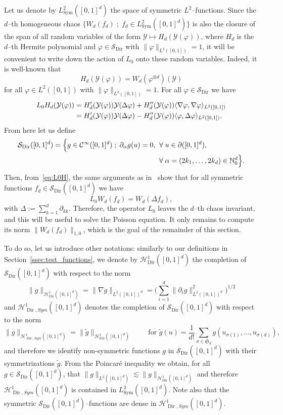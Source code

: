 \documentclass[10pt]{amsart}
\theoremstyle{definition}\newtheorem{defi}[theo]{Definition}\newtheorem{rema}[theo]{Remark}\newtheorem{exam}[theo]{Example}\newtheorem{exem}[theo]{Example}\newtheorem{nota}[theo]{Notation}
\DeclareMathOperator{\Dir}{Dir}
\DeclareMathOperator{\Sym}{Sym}
\newcommand{\bb}[1]{{\mathbb #1}}
\newcommand{\mc}[1]{{\mathcal #1}}
\renewcommand{\mc}[1]{{\mathcal #1}}
\newcommand{\Ctwo}{\ensuremath{\mc S_{\Dir}}}
\newcommand{\SD}{\ensuremath{\mc S_{\Dir}}}
\let\oldforall\forall
\renewcommand*{\forall}{\mathrel{\oldforall}}
\begin{document}

Let us denote by $L^2_{\Sym}([0,1]^d)$ the space of symmetric $L^2$--functions. Since the $d$--th homogeneous chaos $\{W_d(f_d) \; ; \; f_d \in L^2_{\Sym}([0,1]^d)\}$ is also the closure of the span of all random variables of the form $\mc Y \mapsto H_d(\mc Y(\varphi))$, where $H_d$ is the $d$--th Hermite polynomial and $\varphi \in \SD$ with $\|\varphi\|_{L^2([0,1])}=1$, it will be convenient to write down the action of $L_0$ onto these random variables. Indeed, it is well-known that
\[
H_d(\mc Y(\varphi)) = W_d(\varphi^{\otimes d})(\mc Y)
\]
for all $\varphi \in L^2([0,1])$ with $\|\varphi\|_{L^2([0,1])} = 1$. For all $\varphi \in
\Ctwo$ we have
\begin{align}
\notag L_0 H_d (\mc Y(\varphi)) & = H'_d (\mc Y(\varphi)) \mc Y(\Delta \varphi) + H''_d (\mc Y(\varphi)) \langle \nabla \varphi, \nabla \varphi \rangle_{L^2 ([0, 1])}\\
& = H'_d (\mc Y(\varphi)) \mc Y(\Delta \varphi) - H''_d (\mc Y(\varphi))
\langle \varphi, \Delta \varphi \rangle_{L^2 ([0, 1])}. \label{eq:L0H}
\end{align}
From here let us define
\begin{align*}
\mc \SD ([0, 1]^d) = \Big\{ g \in \mc C^\infty ([0, 1]^d) \; ; \; \partial_\alpha g(u) = 0, \; &\forall u \in \partial ([0, 1]^d),
\\ &\forall \alpha=(2k_1,\dots, 2k_d) \in \bb N_0^d \Big\}.
\end{align*}
Then, from~\eqref{eq:L0H}, the same arguments as in~\cite[Lemma~3.7]{Gubinelli2015Energy} show that for all symmetric functions $ f_d \in \SD ([0, 1]^d) $ we have
\begin{equation}\label{eq:L0W}
L_0 W_d (f_d) = W_d (\Delta f_d),
\end{equation}
with $\Delta := \sum_{k = 1}^d \partial_{kk}$. Therefore, the operator $L_0$ leaves the $d$--th chaos invariant, and this will be useful to solve the Poisson equation. It only remains to compute its norm $\|W_d(f_d)\|_{1,0}$, which is the goal of the remainder of this section.

To do so, let us introduce other notations: similarly to our definitions in Section~\ref{ssec:test_functions}, we denote by $\mc H_{\Dir}^1 ([0, 1]^d)$ the completion of $ \SD ([0, 1]^d)$ with respect to the norm
\[
\|g\|_{\mc H_{\Dir}^1 ([0, 1]^d)} = \| \nabla g\|_{L^2([0,1])^d} = \bigg(\sum_{i=1}^d \|\partial_{i} g\|_{L^2([0,1])^d}^2\bigg)^{1/2}
\]
and $\mc H_{\Dir,Sym}^1([0, 1]^d)$ denotes the completion of $\SD ([0, 1]^d)$ with respect to the norm
\[
\| g \|_{\mc H_{\Dir,Sym}^1([0, 1]^d)}= \| \widetilde{g} \|_{\mc H_{\Dir}^1([0, 1]^d)} \qquad \text{ for } \widetilde{g} (u) = \frac{1}{d!} \sum_{\sigma \in \mathfrak{S}_d} g (u_{\sigma (1)}, \ldots, u_{\sigma (d)}),
\]
and therefore we identify non-symmetric functions $g$ in $\SD ([0, 1]^d)$ with their symmetrizations $\widetilde g$. From the Poincar\'e inequality we obtain, for all $g \in \SD ([0, 1]^d)$, that $\| g \|_{L^2 ([0, 1]^d)} \lesssim \| g \|_{\mc H_{\Dir}^1([0, 1]^d)}$ and therefore $\mc H_{\Dir,Sym}^1([0, 1]^d)$ is contained in $L^2_{\Sym} ([0, 1]^d)$. Note also that the symmetric $\mc S_{\Dir}([0,1]^d)$--functions are dense in $\mc H_{\Dir,Sym}^1([0, 1]^d)$.
\end{document}
